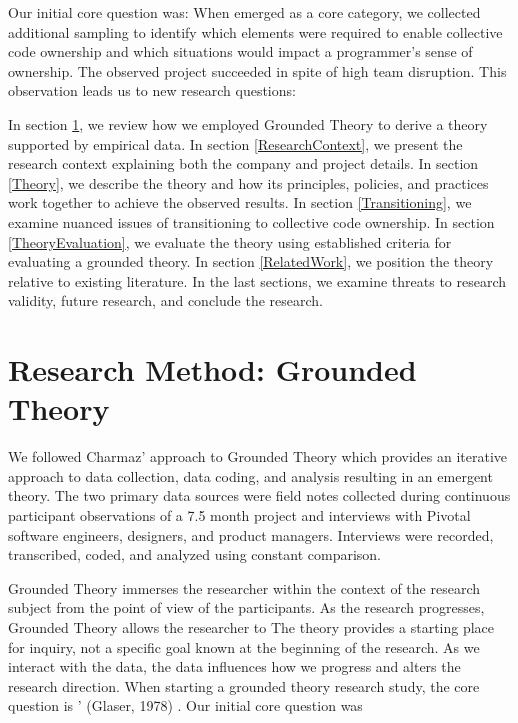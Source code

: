 Our initial core question was:  When  emerged as a core category, we collected additional sampling to identify which elements were required to enable collective code ownership and which situations would impact a programmer's sense of ownership. The observed project succeeded in spite of high team disruption. This observation leads us to new research questions: 

In section \ref{ResearchMethod}, we review how we employed Grounded Theory to derive a theory supported by empirical data. In section \ref{ResearchContext}, we present the research context explaining both the company and project details. In section \ref{Theory}, we describe the theory and how its principles, policies, and practices work together to achieve the observed results. In section \ref{Transitioning}, we examine nuanced issues of transitioning to collective code ownership. In section \ref{TheoryEvaluation}, we evaluate the theory using established criteria for evaluating a grounded theory. In section \ref{RelatedWork}, we position the theory relative to existing literature. In the last sections, we examine threats to research validity, future research, and conclude the research.
\section{Research Method: Grounded Theory}
\label{ResearchMethod}

We followed Charmaz' approach to Grounded Theory \cite{Charmaz} which provides an iterative approach to data collection, data coding, and analysis resulting in an emergent theory. The two primary data sources were field notes collected during continuous participant observations of a 7.5 month project and interviews with Pivotal software engineers, designers, and product managers. Interviews were recorded, transcribed, coded, and analyzed using constant comparison. 

Grounded Theory immerses the researcher within the context of the research subject from the point of view of the participants. As the research progresses, Grounded Theory allows the researcher to  The theory provides a starting place for inquiry, not a specific goal known at the beginning of the research. As we interact with the data, the data influences how we progress and alters the research direction. When starting a grounded theory research study, the core question is ' (Glaser, 1978) \cite{GlaserTheoreticalSensitivity}. Our initial core question was 

